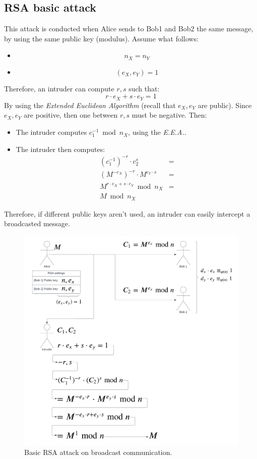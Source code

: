 \subsection{RSA basic attack}
This attack is conducted when Alice sends to Bob1 and Bob2 the same message, by using the same public key (modulus). Assume what follows:
\begin{itemize}
    \item \[n_{X} = n_{Y}\]
    \item \[(e_{X}, e_{Y}) = 1\]
\end{itemize}
Therefore, an intruder can compute $r,s$ such that:
\[r \cdot e_{X} + s \cdot e_{Y} = 1\]
By using the \emph{Extended Euclidean Algorithm} (recall that $e_{X}, e_{Y}$ are public). Since $e_{X}, e_{Y}$ are positive, then one between $r, s$ must be negative. Then:
\begin{itemize}
    \item The intruder computes $c_{1}^{-1} \bmod n_{X}$, using the \emph{E.E.A.}.
    \item The intruder then computes:
    \begin{align*}
        (c_{1}^{-1})^{-r} \cdot c_{2}^{s} & =\\
        (M^{-e_{X}})^{-r} \cdot M^{e_{Y} \cdot s} & =\\
        M^{r \cdot e_{X} + s \cdot e_{Y}} \bmod n_{X} & =\\
        M \bmod n_{X}
    \end{align*}
\end{itemize}
Therefore, if different public keys aren't used, an intruder can easily intercept a broadcasted message.
\begin{figure}[h]
    \centering
    \includegraphics[width=\textwidth]{img/RSA_attack_basic.png}
    \caption{Basic RSA attack on broadcast communication.}
\end{figure}

